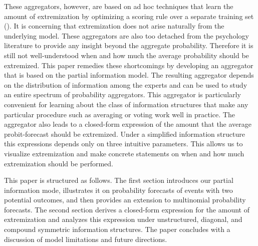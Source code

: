 \documentclass[11pt,twoside]{article}
\begin{document}
These aggregators, however, are based on ad hoc techniques that learn the amount of extremization by optimizing a scoring rule over a separate training set (\citet{Gneiting04strictlyproper}). It is concerning that extremization does not arise naturally from the underlying model. These aggregators are also too detached from the psychology literature to provide any insight beyond the aggregate probability. Therefore it is still not well-understood when and how much the average probability should be extremized. This paper remedies these shortcomings by developing an aggregator that is based on the partial information model. The resulting aggregator depends on the distribution of information among the experts and can be used to study an entire spectrum of probability aggregators. This aggregator is particularly convenient for learning about the class of information structures that make any particular procedure such as averaging or voting work well in practice. The aggregator also leads to a closed-form expression of the amount that the average probit-forecast should be extremized. Under a simplified information structure this expressions depends only on three intuitive parameters. This allows us to visualize extremization and make concrete statements on when and how much extremization should be performed. 




This paper is structured as follows. The first section introduces our partial information mode, illustrates  it on probability forecasts of events with two potential outcomes, and then provides an extension to multinomial probability forecasts.  The second section derives a closed-form expression for the amount of extremization and analyzes this expression under unstructured, diagonal, and compound symmetric information structures. The paper concludes with a discussion of  model limitations and future directions. 
\end{document}
